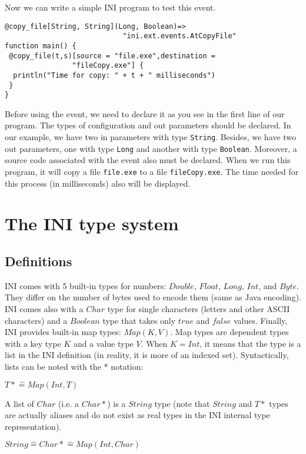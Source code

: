 \documentclass[11pt]{article}
\begin{document}
Now we can write a simple INI program to test this event.
\begin{lstlisting}
@copy_file[String, String](Long, Boolean)=>
                            "ini.ext.events.AtCopyFile"
function main() {
 @copy_file(t,s)[source = "file.exe",destination = 
                "fileCopy.exe"] {
  println("Time for copy: " + t + " milliseconds")
 }
}
\end{lstlisting}
Before using the event, we need to declare it as you see in the first line of our program. The types of configuration and out parameters should be declared. In our example, we have two in parameters with type \texttt{String}. Besides, we have two out parameters, one with type \texttt{Long} and another with type \texttt{Boolean}. Moreover, a source code associated with the event also must be declared. When we run this program, it will copy a file \texttt{file.exe} to a file \texttt{fileCopy.exe}. The time needed for this process (in milliseconds) also will be displayed.

\section{The INI type system}

\subsection{Definitions}

INI comes with 5 built-in types for numbers: $Double$, $Float$, $Long$, $Int$, and $Byte$. They differ on the number of bytes used to encode them (same as Java encoding). INI comes also with a $Char$ type for single characters (letters and other ASCII characters) and a $Boolean$ type that takes only $true$ and $false$ values.
Finally, INI provides built-in map types: $Map(K,V)$. Map types are dependent types with a key type $K$ and a value type $V$. When $K=Int$, it means that the type is a list in the INI definition (in reality, it is more of an indexed set). Syntactically, lists can be noted with the * notation:

\begin{center}
$T* \widehat= Map(Int,T)$
\end{center}

A list of $Char$ (i.e. a $Char*$) is a $String$ type (note that $String$ and $T*$ types are actually aliases and do not exist as real types in the INI internal type representation).

\begin{center}
$String \widehat= Char* \widehat= Map(Int,Char)$
\end{center}
\end{document}
